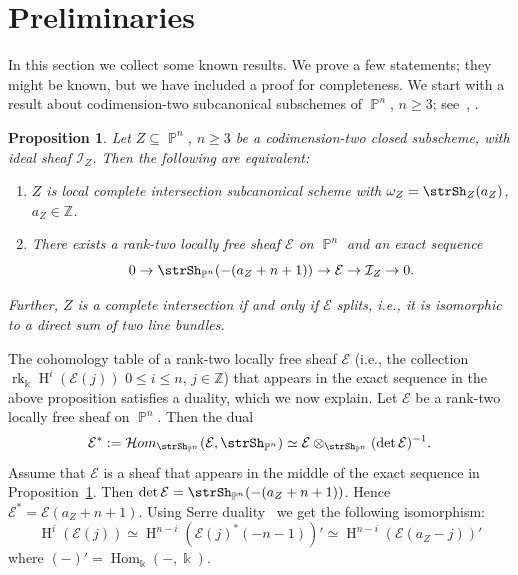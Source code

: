\documentclass[11pt,a4paper]{amsart}
\theoremstyle{plain}
\newtheorem{proposition}[equation]{Proposition}
\theoremstyle{definition}
\newcommand{\calE}{\mathcal E}
\newcommand{\calI}{\mathcal I}
\newcommand{\ints}{\mathbb{Z}}
\DeclareMathOperator{\rank}{rk}
\DeclareMathOperator{\projective}{\mathbb{P}}
\DeclareMathOperator{\Hom}{Hom}
\DeclareMathOperator{\homology}{H}
\newcommand{\sheafHom}{\mathcal{H}om}
\begin{document}
\section{Preliminaries}
\label{section:prelim}

In this section we collect some known results.
We prove a few statements; they might be known, but we have included a
proof for completeness. 
We start with a result about codimension-two subcanonical subschemes of
$\projective^n$, $n \geq 3$;
see~\cite[Proposition~6.1]{HartshorneVarSmallCodim1974}, \cite[Chapter~I,
\S\S~5.1 and~5.2]{OSSvb2011}.
\begin{proposition}
\label{proposition:lcisubcan}
Let $Z \subseteq \projective^n$, $n \geq 3$ be a codimension-two closed
subscheme, with ideal sheaf $\calI_Z$.
Then the following are equivalent:

\begin{enumerate}

\item
$Z$ is local complete intersection subcanonical scheme with
$\omega_Z = \strSh_Z(a_Z)$, $a_Z \in \ints$.

\item
There exists a rank-two locally free sheaf $\calE$ on 
$\projective^n$ and an exact sequence
\[
0 \to \strSh_{\projective^n}(-(a_Z+n+1)) \to \calE \to \calI_Z \to 0.
\]
\end{enumerate}
Further, $Z$ is a complete intersection if and only if $\calE$ splits,
i.e., it is isomorphic to a direct sum of two line bundles.
\end{proposition}

The cohomology table of a rank-two locally free sheaf $\calE$ 
(i.e., the collection 
$\rank_\Bbbk \homology^i(\calE(j))$ $0 \leq i \leq n$, $j \in \ints$)
that appears in the exact sequence in the above proposition satisfies a
duality, which we now explain.
Let $\calE$ be a rank-two locally free sheaf on $\projective^n$.
Then the dual 
\[
\calE^* := 
\sheafHom_{\strSh_{\projective^n}}(\calE, \strSh_{\projective^n})
\simeq
\calE \otimes_{\strSh_{\projective^n}} (\det \calE)^{-1}.
\]
Assume that $\calE$ is a sheaf that appears in the middle of the exact
sequence in Proposition~\ref{proposition:lcisubcan}.
Then $\det \calE = \strSh_{\projective^n}(-(a_Z + n + 1 ) )$.
Hence $\calE^* = \calE(a_Z + n + 1 )$.
Using Serre duality~\cite[Chapter~III Corollary~7.7]{HartAG} 
we get the following isomorphism:
\begin{equation}
\label{equation:duality}
\homology^i(\calE(j)) \simeq 
\homology^{n-i}(\calE(j)^*(-n-1))' 
\simeq \homology^{n-i}(\calE(a_Z - j))' 
\end{equation}
where $(-)' = \Hom_\Bbbk(-, \Bbbk)$.
\end{document}
